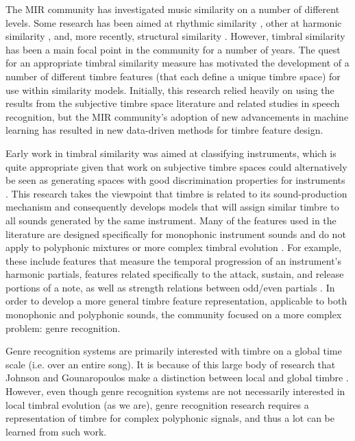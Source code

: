 \documentclass[a4paper,12pt]{report} 	%
\numberwithin{figure}{chapter}
\numberwithin{table}{chapter}
\numberwithin{equation}{chapter}
\begin{document}
\begin{flushleft}
The MIR community has investigated music similarity on a number of different levels. Some research has been aimed at rhythmic similarity \cite{Paulus:2002ec}, other at harmonic similarity \cite{Haas:2009mw}, and, more recently, structural similarity \cite{Bello:NoRead}. However, timbral similarity has been a main focal point in the community for a number of years. The quest for an appropriate timbral similarity measure has motivated the development of a number of different timbre features (that each define a unique timbre space) for use within similarity models. Initially, this research relied heavily on using the results from the subjective timbre space literature and related studies in speech recognition, but the MIR community's adoption of new advancements in machine learning has resulted in new data-driven methods for timbre feature design.

Early work in timbral similarity was aimed at classifying instruments, which is quite appropriate given that work on subjective timbre spaces could alternatively be seen as generating spaces with good discrimination properties for instruments \cite{Loureiro:2000wq, Park:2004fv, Timoney:2004ff, Zhang:2006jo}. This research takes the viewpoint that timbre is related to its sound-production mechanism and consequently develops models that will assign similar timbre to all sounds generated by the same instrument. Many of the features used in the literature are designed specifically for monophonic instrument sounds and do not apply to polyphonic mixtures or more complex timbral evolution \cite[p. 6]{Ciglar:2009uf}. For example, these include features that measure the temporal progression of an instrument's harmonic partials, features related specifically to the attack, sustain, and release portions of a note, as well as strength relations between odd/even partials \cite[p. 182]{Timoney:2004ff}. In order to develop a more general timbre feature representation, applicable to both monophonic and polyphonic sounds, the community focused on a more complex problem: genre recognition.

Genre recognition systems are primarily interested with timbre on a global time scale (i.e. over an entire song). It is because of this large body of research that Johnson and Gounaropoulos make a distinction between local and global timbre \cite{Johnson:2006pi}. However, even though genre recognition systems are not necessarily interested in local timbral evolution (as we are), genre recognition research requires a representation of timbre for complex polyphonic signals, and thus a lot can be learned from such work.


\end{flushleft}
\end{document}
